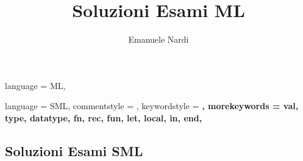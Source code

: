 
\author{Emanuele Nardi}
\title{Soluzioni Esami ML}

\newcommand{\pdfTitle}{UNITN -- Soluzioni Esami SML}
\newcommand{\tags}{SML}

\newcommand{\subject}{Programmazione Funzionale}
\newcommand{\authorName}{Emanuele Nardi}




\usepackage{mdframed}







 {
	language = ML,
}


 {
	language = SML,
	commentstyle = \color{ashgrey},
	keywordstyle = \color{black}\bfseries,
	morekeywords = {
		val, type, datatype,
		fn, rec, fun,
		let, local, in, end,
	}
}




\begin{center}
    \section*{Soluzioni Esami SML}
\end{center}

